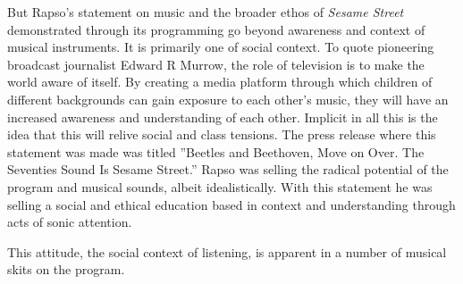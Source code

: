 \documentclass[12pt,letterpaper]{article}
\newcommand{\ses}{\textit{Sesame Street }}
\begin{document}
	But Rapso's statement on music and the broader ethos of \ses 
	demonstrated through its programming go beyond awareness and context of 
	musical instruments. It is primarily one of social context. To quote 
	pioneering broadcast journalist Edward R Murrow,
	the role of television is to make the world aware of
	itself.\autocite[49]{Davis} By creating a media platform through which 
	children of different backgrounds can gain exposure to each other's 
	music, they
	will have an increased awareness and understanding of each other.
	Implicit in all this is the idea that this will relive social and class
	tensions. The press release where this statement was made was titled 
	''Beetles and Beethoven, Move on Over. The Seventies Sound Is Sesame 
	Street.'' Rapso was selling the radical potential of the program and
	musical sounds, albeit idealistically. With this statement he was 
	selling a social and ethical education based in context and 
	understanding through acts of sonic attention. 

	This attitude, the social context of listening, is apparent in a number 
	of musical skits on the program.  
\end{document}
